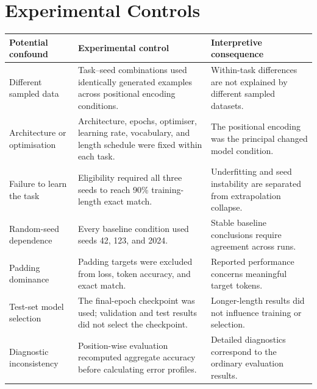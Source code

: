 \documentclass[
    author={Aanchala Ravindra Bhongade},
    supervisor={Dr. Fernando Moreno-Pino},
    degree={MSc},
    title={Length Generalisation in Transformer-Based Sequence Models: Failure Taxonomy and Mitigation Strategies},
    subtitle={},
    type={},
    year={2026}
]{dissertation}
\begin{document}
\clearpage

\section{Experimental Controls}
\label{app:experimental-controls}

\begin{table}[htbp]
\centering
\scriptsize
\renewcommand{\arraystretch}{1.12}
\begin{tabular}{
    p{}
    p{}
    p{}
}
\hline
\textbf{Potential confound} &
\textbf{Experimental control} &
\textbf{Interpretive consequence} \\
\hline

Different sampled data &
Task--seed combinations used identically generated examples across positional
encoding conditions. &
Within-task differences are not explained by different sampled datasets. \\

Architecture or optimisation &
Architecture, epochs, optimiser, learning rate, vocabulary, and length
schedule were fixed within each task. &
The positional encoding was the principal changed model condition. \\

Failure to learn the task &
Eligibility required all three seeds to reach 90\% training-length exact
match. &
Underfitting and seed instability are separated from extrapolation collapse. \\

Random-seed dependence &
Every baseline condition used seeds 42, 123, and 2024. &
Stable baseline conclusions require agreement across runs. \\

Padding dominance &
Padding targets were excluded from loss, token accuracy, and exact match. &
Reported performance concerns meaningful target tokens. \\

Test-set model selection &
The final-epoch checkpoint was used; validation and test results did not
select the checkpoint. &
Longer-length results did not influence training or selection. \\

Diagnostic inconsistency &
Position-wise evaluation recomputed aggregate accuracy before calculating
error profiles. &
Detailed diagnostics correspond to the ordinary evaluation results. \\


\end{tabular}
\end{table}
\end{document}
